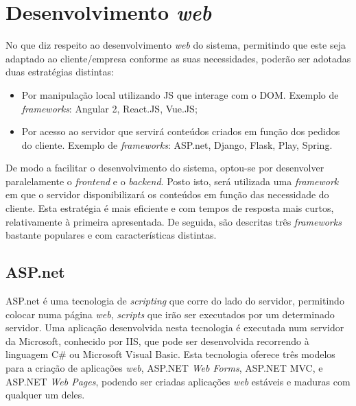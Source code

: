 

\section{Desenvolvimento \textit{web}}



No que diz respeito ao desenvolvimento \textit{web} do sistema, permitindo que este seja adaptado ao cliente/empresa conforme as suas necessidades, poderão ser adotadas duas estratégias distintas: 

\begin{itemize}
	\item Por manipulação local utilizando \ac{JS} que interage com o \ac{DOM}. Exemplo de \textit{frameworks}: Angular 2, React.JS, Vue.JS; 
	
	\item Por acesso ao servidor que servirá conteúdos criados em função dos pedidos do cliente. Exemplo de \textit{frameworks}: ASP.net, Django, Flask, Play, Spring. 
	
\end{itemize}


De modo a facilitar o desenvolvimento do sistema, optou-se por desenvolver paralelamente o \textit{frontend} e o \textit{backend}. Posto isto, será utilizada uma \textit{framework} em que o servidor disponibilizará os conteúdos em função das necessidade do cliente. Esta estratégia é mais eficiente e com tempos de resposta mais curtos, relativamente à primeira apresentada. De seguida, são descritas três \textit{frameworks} bastante populares e com características distintas. 




\subsection{ASP.net}


ASP.net é uma tecnologia de \textit{scripting} que corre do lado do servidor, permitindo colocar numa página \textit{web}, \textit{scripts} que irão ser executados por um determinado servidor. Uma aplicação desenvolvida nesta tecnologia é executada num servidor da Microsoft, conhecido por \ac{IIS}, que pode ser desenvolvida recorrendo à linguagem C\# ou Microsoft Visual Basic. Esta tecnologia oferece três modelos para a criação de aplicações \textit{web}, ASP.NET \textit{Web Forms}, ASP.NET \ac{MVC}, e ASP.NET \textit{Web Pages}, podendo ser criadas aplicações \textit{web} estáveis e maduras com qualquer um deles\cite{Microsoft2016}. 


